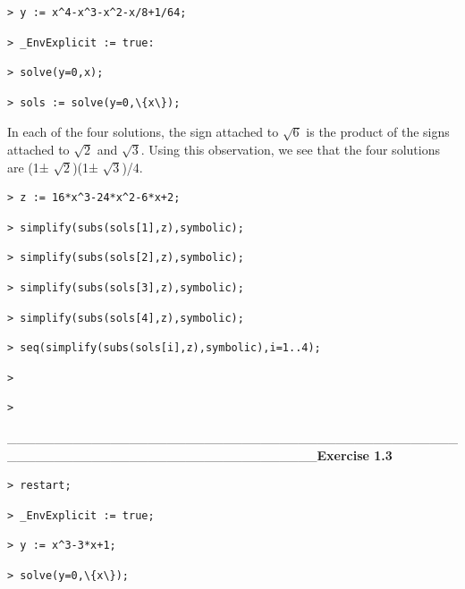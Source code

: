 \documentclass{article}
\begin{document}
\begin{lstlisting}
> y := x^4-x^3-x^2-x/8+1/64;
\end{lstlisting}
\begin{lstlisting}
> _EnvExplicit := true:
\end{lstlisting}
\begin{lstlisting}
> solve(y=0,x);
\end{lstlisting}
\begin{lstlisting}
> sols := solve(y=0,\{x\});
\end{lstlisting}
In each of the four solutions, the sign attached to 
$ \sqrt{6} $ is the product of the signs attached to 
$ \sqrt{2} $ and 
$ \sqrt{3} $.  Using this observation, we see that the four solutions are (1±
$ \sqrt{2} $)(1±
$ \sqrt{3} $)/4.\begin{lstlisting}
> z := 16*x^3-24*x^2-6*x+2;
\end{lstlisting}
\begin{lstlisting}
> simplify(subs(sols[1],z),symbolic);
\end{lstlisting}
\begin{lstlisting}
> simplify(subs(sols[2],z),symbolic);
\end{lstlisting}
\begin{lstlisting}
> simplify(subs(sols[3],z),symbolic);
\end{lstlisting}
\begin{lstlisting}
> simplify(subs(sols[4],z),symbolic);
\end{lstlisting}
\begin{lstlisting}
> seq(simplify(subs(sols[i],z),symbolic),i=1..4);
\end{lstlisting}
\begin{lstlisting}
> 
\end{lstlisting}
\begin{lstlisting}
> 
\end{lstlisting}
\_\_\_\_\_\_\_\_\_\_\_\_\_\_\_\_\_\_\_\_\_\_\_\_\_\_\_\_\_\_\_\_\_\_\_\_\_\_\_\_\_\_\_\_\_\_\_\_\_\_\_\_\_\_\_\_\_\_\_\_\_\_\_\_\_\_\_\_\_\_\_\_\_\_\_\_\_\_\_\_\_\textbf{Exercise 1.3}\begin{lstlisting}
> restart;
\end{lstlisting}
\begin{lstlisting}
> _EnvExplicit := true;
\end{lstlisting}
\begin{lstlisting}
> y := x^3-3*x+1;
\end{lstlisting}
\begin{lstlisting}
> solve(y=0,\{x\});
\end{lstlisting}
\end{document}

